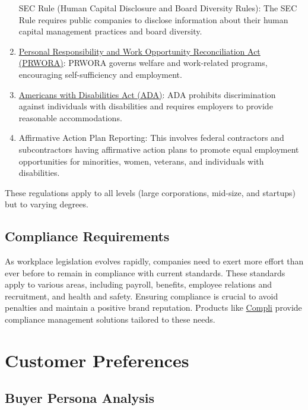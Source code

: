 \documentclass[
  a4paper,
]{book}
\begin{document}
\begin{enumerate}
  SEC Rule (Human Capital Disclosure and Board Diversity Rules): The SEC
  Rule requires public companies to disclose information about their
  human capital management practices and board diversity.
\item
  \href{https://www.congress.gov/bill/104th-congress/house-bill/3734}{Personal
  Responsibility and Work Opportunity Reconciliation Act (PRWORA)}:
  PRWORA governs welfare and work-related programs, encouraging
  self-sufficiency and employment.
\item
  \href{https://www.ada.gov/}{Americans with Disabilities Act (ADA)}:
  ADA prohibits discrimination against individuals with disabilities and
  requires employers to provide reasonable accommodations.
\item
  Affirmative Action Plan Reporting: This involves federal contractors
  and subcontractors having affirmative action plans to promote equal
  employment opportunities for minorities, women, veterans, and
  individuals with disabilities.
\end{enumerate}

These regulations apply to all levels (large corporations, mid-size, and
startups) but to varying degrees.

\hypertarget{compliance-requirements}{%
\subsection{Compliance Requirements}\label{compliance-requirements}}

As workplace legislation evolves rapidly, companies need to exert more
effort than ever before to remain in compliance with current standards.
These standards apply to various areas, including payroll, benefits,
employee relations and recruitment, and health and safety. Ensuring
compliance is crucial to avoid penalties and maintain a positive brand
reputation. Products like \href{https://www.compli.com/}{Compli} provide
compliance management solutions tailored to these needs.

\hypertarget{customer-preferences}{%
\section{Customer Preferences}\label{customer-preferences}}

\hypertarget{buyer-persona-analysis}{%
\subsection{Buyer Persona Analysis}\label{buyer-persona-analysis}}
\end{document}
